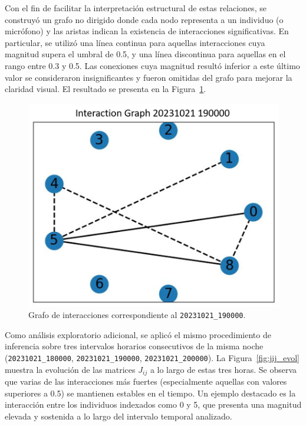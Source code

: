 Con el fin de facilitar la interpretación estructural de estas 
relaciones, se construyó un grafo no dirigido donde cada nodo 
representa a un individuo (o micrófono) y las aristas indican 
la existencia de interacciones significativas. En particular, 
se utilizó una línea continua para aquellas interacciones cuya 
magnitud supera el umbral de 0.5, y una línea discontinua para 
aquellas en el rango entre 0.3 y 0.5. Las conexiones cuya 
magnitud resultó inferior a este último valor se consideraron 
insignificantes y fueron omitidas del grafo para mejorar la 
claridad visual. El resultado se presenta en la 
Figura~\ref{fig:graph}.

\begin{figure}[ht]
    \centering
    \includegraphics[width=0.7\linewidth]{Graphics/corr_graph.png}
    \caption{Grafo de interacciones correspondiente al \texttt{20231021\_190000}.}
    \label{fig:graph}
\end{figure}

Como análisis exploratorio adicional, se aplicó el mismo 
procedimiento de inferencia sobre tres intervalos horarios 
consecutivos de la misma noche (\texttt{20231021\_180000}, \texttt{20231021\_190000}, \texttt{20231021\_200000}). 
La Figura~\ref{fig:jij_evol} 
muestra la evolución de las matrices \( J_{ij} \) a lo largo 
de estas tres horas. Se observa que varias de las interacciones 
más fuertes (especialmente aquellas con valores superiores a 
0.5) se mantienen estables en el tiempo. Un ejemplo destacado es 
la interacción entre los individuos indexados como 0 y 5, que 
presenta una magnitud elevada y sostenida a lo largo del 
intervalo temporal analizado.

